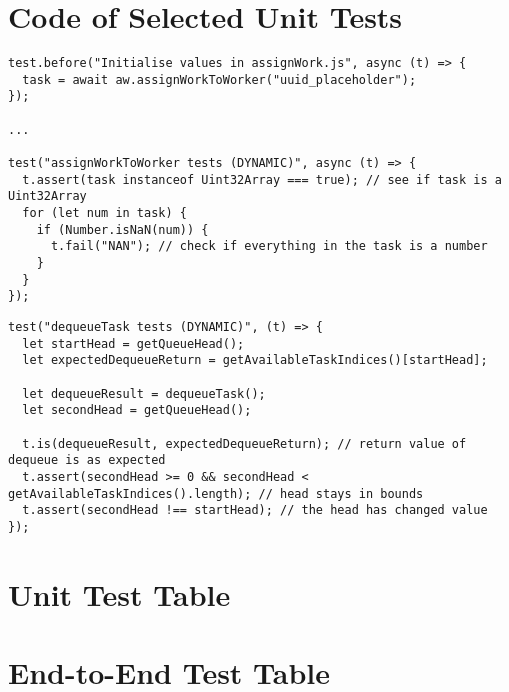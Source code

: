 \chapter{Code of Selected Unit Tests}\label{ch:unitTestsCode}
\begin{lstlisting}[caption=Code for the unit test of assignWorkToWorker, label=lst:assignWorkToWorker] 
test.before("Initialise values in assignWork.js", async (t) => {
  task = await aw.assignWorkToWorker("uuid_placeholder");
});

...

test("assignWorkToWorker tests (DYNAMIC)", async (t) => {
  t.assert(task instanceof Uint32Array === true); // see if task is a Uint32Array
  for (let num in task) {
    if (Number.isNaN(num)) {
      t.fail("NAN"); // check if everything in the task is a number
    }
  }
});
\end{lstlisting}

\begin{lstlisting}[caption=Code for the unit test of dequeueTask, label=lst:dequeueTask] 
test("dequeueTask tests (DYNAMIC)", (t) => {
  let startHead = getQueueHead();
  let expectedDequeueReturn = getAvailableTaskIndices()[startHead];

  let dequeueResult = dequeueTask();
  let secondHead = getQueueHead();

  t.is(dequeueResult, expectedDequeueReturn); // return value of dequeue is as expected
  t.assert(secondHead >= 0 && secondHead < getAvailableTaskIndices().length); // head stays in bounds
  t.assert(secondHead !== startHead); // the head has changed value
});
\end{lstlisting}


\chapter{Unit Test Table}\label{ap:UnitTestTable}


\chapter{End-to-End Test Table}\label{ap:E2ETestTable}

